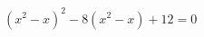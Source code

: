 \begin{ex}[type=equation]
	\begin{condition}
		$\left(x^2 - x\right)^2 - 8\left(x^2 - x\right) + 12 = 0$
	\end{condition}
\end{ex}